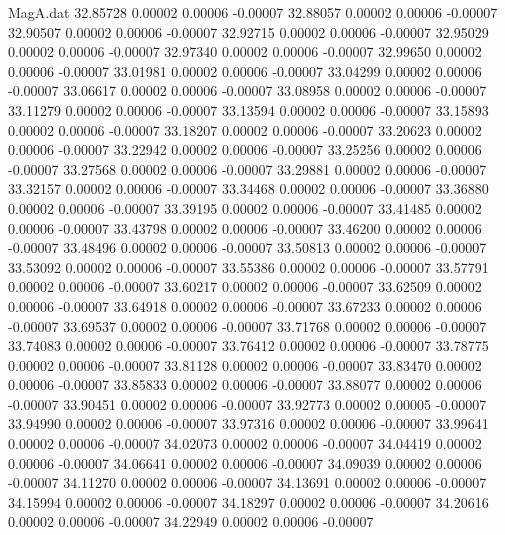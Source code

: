 \begin{filecontents}{MagA.dat}
  32.85728    0.00002    0.00006   -0.00007
  32.88057    0.00002    0.00006   -0.00007
  32.90507    0.00002    0.00006   -0.00007
  32.92715    0.00002    0.00006   -0.00007
  32.95029    0.00002    0.00006   -0.00007
  32.97340    0.00002    0.00006   -0.00007
  32.99650    0.00002    0.00006   -0.00007
  33.01981    0.00002    0.00006   -0.00007
  33.04299    0.00002    0.00006   -0.00007
  33.06617    0.00002    0.00006   -0.00007
  33.08958    0.00002    0.00006   -0.00007
  33.11279    0.00002    0.00006   -0.00007
  33.13594    0.00002    0.00006   -0.00007
  33.15893    0.00002    0.00006   -0.00007
  33.18207    0.00002    0.00006   -0.00007
  33.20623    0.00002    0.00006   -0.00007
  33.22942    0.00002    0.00006   -0.00007
  33.25256    0.00002    0.00006   -0.00007
  33.27568    0.00002    0.00006   -0.00007
  33.29881    0.00002    0.00006   -0.00007
  33.32157    0.00002    0.00006   -0.00007
  33.34468    0.00002    0.00006   -0.00007
  33.36880    0.00002    0.00006   -0.00007
  33.39195    0.00002    0.00006   -0.00007
  33.41485    0.00002    0.00006   -0.00007
  33.43798    0.00002    0.00006   -0.00007
  33.46200    0.00002    0.00006   -0.00007
  33.48496    0.00002    0.00006   -0.00007
  33.50813    0.00002    0.00006   -0.00007
  33.53092    0.00002    0.00006   -0.00007
  33.55386    0.00002    0.00006   -0.00007
  33.57791    0.00002    0.00006   -0.00007
  33.60217    0.00002    0.00006   -0.00007
  33.62509    0.00002    0.00006   -0.00007
  33.64918    0.00002    0.00006   -0.00007
  33.67233    0.00002    0.00006   -0.00007
  33.69537    0.00002    0.00006   -0.00007
  33.71768    0.00002    0.00006   -0.00007
  33.74083    0.00002    0.00006   -0.00007
  33.76412    0.00002    0.00006   -0.00007
  33.78775    0.00002    0.00006   -0.00007
  33.81128    0.00002    0.00006   -0.00007
  33.83470    0.00002    0.00006   -0.00007
  33.85833    0.00002    0.00006   -0.00007
  33.88077    0.00002    0.00006   -0.00007
  33.90451    0.00002    0.00006   -0.00007
  33.92773    0.00002    0.00005   -0.00007
  33.94990    0.00002    0.00006   -0.00007
  33.97316    0.00002    0.00006   -0.00007
  33.99641    0.00002    0.00006   -0.00007
  34.02073    0.00002    0.00006   -0.00007
  34.04419    0.00002    0.00006   -0.00007
  34.06641    0.00002    0.00006   -0.00007
  34.09039    0.00002    0.00006   -0.00007
  34.11270    0.00002    0.00006   -0.00007
  34.13691    0.00002    0.00006   -0.00007
  34.15994    0.00002    0.00006   -0.00007
  34.18297    0.00002    0.00006   -0.00007
  34.20616    0.00002    0.00006   -0.00007
  34.22949    0.00002    0.00006   -0.00007

\end{filecontents}
